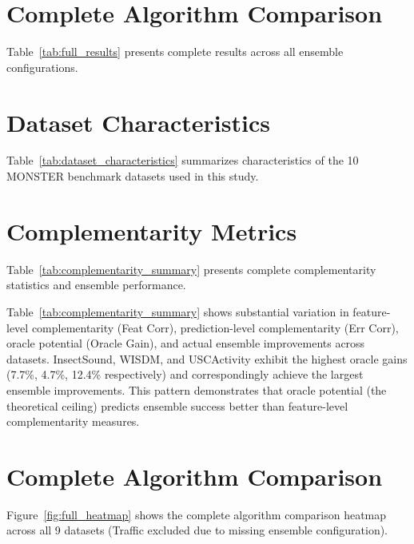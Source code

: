 \documentclass[pdflatex,sn-basic]{sn-jnl}           %
\theoremstyle{thmstyleone}%
\theoremstyle{thmstyletwo}%
\theoremstyle{thmstylethree}%
\begin{document}
\begin{appendices}

\section{Complete Algorithm Comparison}\label{appA}

Table~\ref{tab:full_results} presents complete results across all ensemble configurations.



\clearpage

\section{Dataset Characteristics}\label{appB}

Table~\ref{tab:dataset_characteristics} summarizes characteristics of the 10 MONSTER benchmark datasets used in this study.



\clearpage

\section{Complementarity Metrics}\label{appC}

Table~\ref{tab:complementarity_summary} presents complete complementarity statistics and ensemble performance.



Table~\ref{tab:complementarity_summary} shows substantial variation in feature-level complementarity (Feat Corr), prediction-level complementarity (Err Corr), oracle potential (Oracle Gain), and actual ensemble improvements across datasets. InsectSound, WISDM, and USCActivity exhibit the highest oracle gains (7.7\%, 4.7\%, 12.4\% respectively) and correspondingly achieve the largest ensemble improvements. This pattern demonstrates that oracle potential (the theoretical ceiling) predicts ensemble success better than feature-level complementarity measures.

\clearpage

\section{Complete Algorithm Comparison}\label{appD}

Figure~\ref{fig:full_heatmap} shows the complete algorithm comparison heatmap across all 9 datasets (Traffic excluded due to missing ensemble configuration).


\end{appendices}
\end{document}
